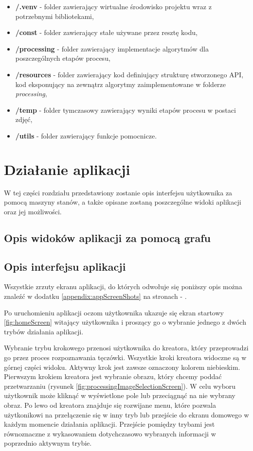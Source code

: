 \begin{itemize}
  \item \textbf{/.venv} - folder zawierający wirtualne środowisko projektu wraz z potrzebnymi
  bibliotekami,
  \item \textbf{/const} - folder zawierający stałe używane przez resztę kodu,
  \item \textbf{/processing} - folder zawierający implementacje algorytmów dla poszczególnych etapów
  procesu,
  \item \textbf{/resources} - folder zawierający kod definiujący strukturę stworzonego API,
  kod eksponujący na zewnątrz algorytmy zaimplementowane w folderze \textit{processing},
  \item \textbf{/temp} - folder tymczasowy zawierający wyniki etapów procesu w postaci zdję\'c,
  \item \textbf{/utils} - folder zawierający funkcje pomocnicze.
\end{itemize}

\section{Działanie aplikacji}

W tej części rozdziału przedstawiony zostanie opis interfejsu użytkownika za pomocą
maszyny stanów, a także opisane zostaną poszczególne widoki aplikacji oraz jej możliwości.

\subsection{Opis widoków aplikacji za pomocą grafu}

\subsection{Opis interfejsu aplikacji}

Wszystkie zrzuty ekranu aplikacji, do których odwołuje się poniższy opis można znale\'z\'c w dodatku
\ref{appendix:appScreenShots} na stronach \pageref{fig:homeScreen} - \pageref{fig:batchResults}. \newline

Po uruchomieniu aplikacji oczom użytkownika ukazuje się ekran startowy \ref{fig:homeScreen} witający użytkownika
i proszący go o wybranie jednego z dwóch trybów działania aplikacji.\newline

Wybranie trybu krokowego przenosi użytkownika do kreatora, który przeprowadzi go przez proces
rozpoznawania tęczówki. Wszystkie kroki kreatora widoczne są w górnej części widoku. Aktywny krok
jest zawsze oznaczony kolorem niebieskim. Pierwszym krokiem kreatora jest wybranie obrazu, który chcemy
podda\'c przetwarzaniu (rysunek \ref{fig:processingImageSelectionScreen}). W celu wyboru użytkownik może klikną\'c w wyświetlone pole lub
przeciągną\'c na nie wybrany obraz. Po lewo od kreatora znajduje się rozwijane menu, które
pozwala użytkonikowi na przełączenie się w inny tryb lub przejście do ekranu domowego w każdym
momencie działania aplikacji. Przejście pomiędzy trybami jest równoznaczne z wykasowaniem
dotychczasowo wybranych informacji w poprzednio aktywnym trybie.

